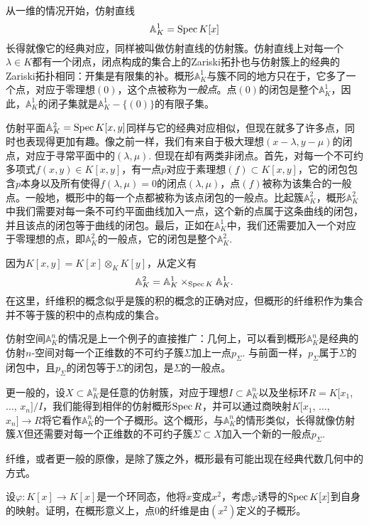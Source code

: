 从一维的情况开始，仿射直线
\[
	\mathbb{A}^1_K=\operatorname{Spec} K[x]
\]
长得就像它的经典对应，同样被叫做仿射直线的仿射簇。仿射直线上对每一个$\lambda\in K$都有一个闭点，闭点构成的集合上的Zariski拓扑也与仿射簇上的经典的Zariski拓扑相同：开集是有限集的补。概形$\mathbb{A}^1_K$与簇不同的地方只在于，它多了一个点，对应于零理想$(0)$，这个点被称为\textit{一般点}。点$(0)$的闭包是整个$\mathbb{A}^1_K$，因此，$\mathbb{A}^1_K$的闭子集就是$\mathbb{A}^1_K-\{(0)\}$的有限子集。


仿射平面$\mathbb{A}^2_K=\operatorname{Spec} K[x,y]$同样与它的经典对应相似，但现在就多了许多点，同时也表现得更加有趣。像之前一样，我们有来自于极大理想$(x-\lambda,y-\mu)$的闭点，对应于寻常平面中的$(\lambda,\mu)$. 但现在却有两类非闭点。首先，对每一个不可约多项式$f(x,y)\in K[x,y]$，有一点$p$对应于素理想$(f)\subset K[x,y]$，它的闭包包含$p$本身以及所有使得$f(\lambda,\mu)=0$的闭点$(\lambda,\mu)$，点$(f)$被称为该集合的一般点。一般地，概形中的每一个点都被称为该点闭包的一般点。比起簇$\mathbb{A}^2_K$，概形$\mathbb{A}^2_K$中我们需要对每一条不可约平面曲线加入一点，这个新的点属于这条曲线的闭包，并且该点的闭包等于曲线的闭包。最后，正如在$\mathbb{A}^1_K$中，我们还需要加入一个对应于零理想的点，即$\mathbb{A}^2_K$的一般点，它的闭包是整个$\mathbb{A}^2_K$.


因为$K[x,y]=K[x]\otimes_K K[y]$，从定义有
\[
	\mathbb{A}^2_K=\mathbb{A}^1_K\times_{\operatorname{Spec} K}\mathbb{A}^1_K.
\]
在这里，纤维积的概念似乎是簇的积的概念的正确对应，但概形的纤维积作为集合并不等于簇的积中的点构成的集合。

仿射空间$\mathbb{A}^n_K$的情况是上一个例子的直接推广：几何上，可以看到概形$\mathbb{A}^n_K$是经典的仿射$n$-空间对每一个正维数的不可约子簇$\Sigma$加上一点$p_\Sigma$. 与前面一样，$p_\Sigma$属于$\Sigma$的闭包中，且$p_\Sigma$的闭包等于$\Sigma$的闭包，是$\Sigma$的一般点。

更一般的，设$X\subset \mathbb{A}^n_K$是任意的仿射簇，对应于理想$I\subset \mathbb{A}^n_K$以及坐标环$R=K[x_1$, $\dots$, $x_n]/I$，我们能得到相伴的仿射概形$\operatorname{Spec} R$，并可以通过商映射$K[x_1$, $\dots$, $x_n]\to R$将它看作$\mathbb{A}^n_K$的一个子概形。这个概形，与$\mathbb{A}^n_K$的情形类似，长得就像仿射簇$X$但还需要对每一个正维数的不可约子簇$\Sigma\subset X$加入一个新的一般点$p_\Sigma$.

纤维，或者更一般的原像，是除了簇之外，概形最有可能出现在经典代数几何中的方式。

\begin{exe} \label{exe.2.2}
设$\varphi:K[x]\to K[x]$是一个环同态，他将$x$变成$x^2$，考虑$\varphi$诱导的$\operatorname{Spec} K[x]$到自身的映射。证明，在概形意义上，点$0$的纤维是由$(x^2)$定义的子概形。

\end{exe}

